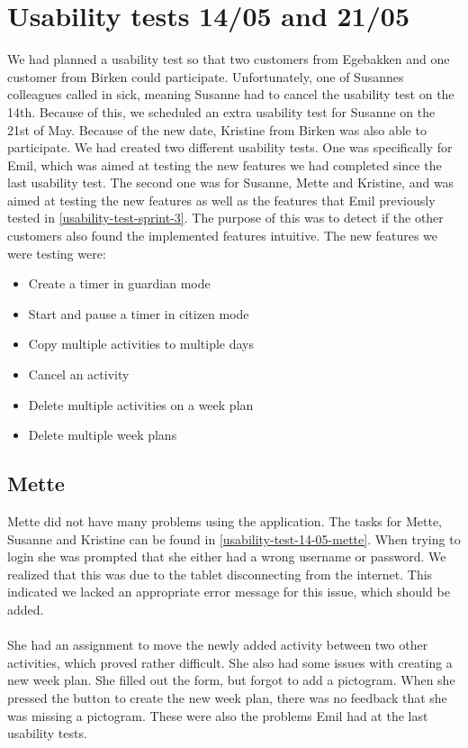 \section{Usability tests 14/05 and 21/05}\label{usability-test-14-21-05}
We had planned a usability test so that two customers from Egebakken and one customer from Birken could participate.
Unfortunately, one of Susannes colleagues called in sick, meaning Susanne had to cancel the usability test on the 14th.
Because of this, we scheduled an extra usability test for Susanne on the 21st of May. 
Because of the new date, Kristine from Birken was also able to participate. 
We had created two different usability tests. 
One was specifically for Emil, which was aimed at testing the new features we had completed since the last usability test.
The second one was for Susanne, Mette and Kristine, and was aimed at testing the new features as well as the features that Emil previously tested in \autoref{usability-test-sprint-3}. 
The purpose of this was to detect if the other customers also found the implemented features intuitive.
\noindent
The new features we were testing were:

\begin{itemize}
  \item Create a timer in guardian mode
  \item Start and pause a timer in citizen mode
  \item Copy multiple activities to multiple days
  \item Cancel an activity
  \item Delete multiple activities on a week plan
  \item Delete multiple week plans
\end{itemize}


\subsection{Mette}
Mette did not have many problems using the application.
The tasks for Mette, Susanne and Kristine can be found in \autoref{usability-test-14-05-mette}.
When trying to login she was prompted that she either had a wrong username or password. 
We realized that this was due to the tablet disconnecting from the internet.
This indicated we lacked an appropriate error message for this issue, which should be added.
\\\\
She had an assignment to move the newly added activity between two other activities, which proved rather difficult. 
She also had some issues with creating a new week plan.
She filled out the form, but forgot to add a pictogram. 
When she pressed the button to create the new week plan, there was no feedback that she was missing a pictogram.
These were also the problems Emil had at the last usability tests.


